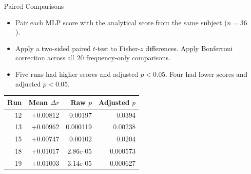 \documentclass[aspectratio=169,11pt]{beamer}
\begin{document}
\begin{frame}[t]{Paired Comparisons}
\begin{itemize}
\item Pair each MLP score with the analytical score from the same subject ($n=36$).
\item Apply a two-sided paired $t$-test to Fisher-$z$ differences. Apply Bonferroni correction across all 20 frequency-only comparisons.
\item Five runs had higher scores and adjusted $p<0.05$. Four had lower scores and adjusted $p<0.05$.
\end{itemize}\vspace{0.15cm}\centering\footnotesize
\begin{tabular}{rrrr}\toprule
Run & Mean $\Delta r$ & Raw $p$ & Adjusted $p$\\\midrule
12 & +0.00812 & 0.00197 & 0.0394\\
13 & +0.00962 & 0.000119 & 0.00238\\
15 & +0.00747 & 0.00102 & 0.0204\\
18 & +0.01017 & 2.86e-05 & 0.000573\\
19 & +0.01003 & 3.14e-05 & 0.000627\\\bottomrule\end{tabular}
\end{frame}
\end{document}
